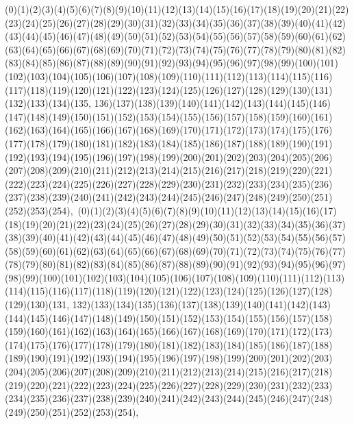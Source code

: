 \documentclass[12pt]{article}
\begin{document}
{(0)(1)(2)(3)(4)(5)(6)(7)(8)(9)(10)(11)(12)(13)(14)(15)(16)(17)(18)(19)(20)(21)(22)(23)(24)(25)(26)(27)(28)(29)(30)(31)(32)(33)(34)(35)(36)(37)(38)(39)(40)(41)(42)(43)(44)(45)(46)(47)(48)(49)(50)(51)(52)(53)(54)(55)(56)(57)(58)(59)(60)(61)(62)(63)(64)(65)(66)(67)(68)(69)(70)(71)(72)(73)(74)(75)(76)(77)(78)(79)(80)(81)(82)(83)(84)(85)(86)(87)(88)(89)(90)(91)(92)(93)(94)(95)(96)(97)(98)(99)(100)(101)(102)(103)(104)(105)(106)(107)(108)(109)(110)(111)(112)(113)(114)(115)(116)(117)(118)(119)(120)(121)(122)(123)(124)(125)(126)(127)(128)(129)(130)(131)(132)(133)(134)(135, 136)(137)(138)(139)(140)(141)(142)(143)(144)(145)(146)(147)(148)(149)(150)(151)(152)(153)(154)(155)(156)(157)(158)(159)(160)(161)(162)(163)(164)(165)(166)(167)(168)(169)(170)(171)(172)(173)(174)(175)(176)(177)(178)(179)(180)(181)(182)(183)(184)(185)(186)(187)(188)(189)(190)(191)(192)(193)(194)(195)(196)(197)(198)(199)(200)(201)(202)(203)(204)(205)(206)(207)(208)(209)(210)(211)(212)(213)(214)(215)(216)(217)(218)(219)(220)(221)(222)(223)(224)(225)(226)(227)(228)(229)(230)(231)(232)(233)(234)(235)(236)(237)(238)(239)(240)(241)(242)(243)(244)(245)(246)(247)(248)(249)(250)(251)(252)(253)(254)$
, 
$
(0)(1)(2)(3)(4)(5)(6)(7)(8)(9)(10)(11)(12)(13)(14)(15)(16)(17)(18)(19)(20)(21)(22)(23)(24)(25)(26)(27)(28)(29)(30)(31)(32)(33)(34)(35)(36)(37)(38)(39)(40)(41)(42)(43)(44)(45)(46)(47)(48)(49)(50)(51)(52)(53)(54)(55)(56)(57)(58)(59)(60)(61)(62)(63)(64)(65)(66)(67)(68)(69)(70)(71)(72)(73)(74)(75)(76)(77)(78)(79)(80)(81)(82)(83)(84)(85)(86)(87)(88)(89)(90)(91)(92)(93)(94)(95)(96)(97)(98)(99)(100)(101)(102)(103)(104)(105)(106)(107)(108)(109)(110)(111)(112)(113)(114)(115)(116)(117)(118)(119)(120)(121)(122)(123)(124)(125)(126)(127)(128)(129)(130)(131, 132)(133)(134)(135)(136)(137)(138)(139)(140)(141)(142)(143)(144)(145)(146)(147)(148)(149)(150)(151)(152)(153)(154)(155)(156)(157)(158)(159)(160)(161)(162)(163)(164)(165)(166)(167)(168)(169)(170)(171)(172)(173)(174)(175)(176)(177)(178)(179)(180)(181)(182)(183)(184)(185)(186)(187)(188)(189)(190)(191)(192)(193)(194)(195)(196)(197)(198)(199)(200)(201)(202)(203)(204)(205)(206)(207)(208)(209)(210)(211)(212)(213)(214)(215)(216)(217)(218)(219)(220)(221)(222)(223)(224)(225)(226)(227)(228)(229)(230)(231)(232)(233)(234)(235)(236)(237)(238)(239)(240)(241)(242)(243)(244)(245)(246)(247)(248)(249)(250)(251)(252)(253)(254)$
, 
$
}
\end{document}
